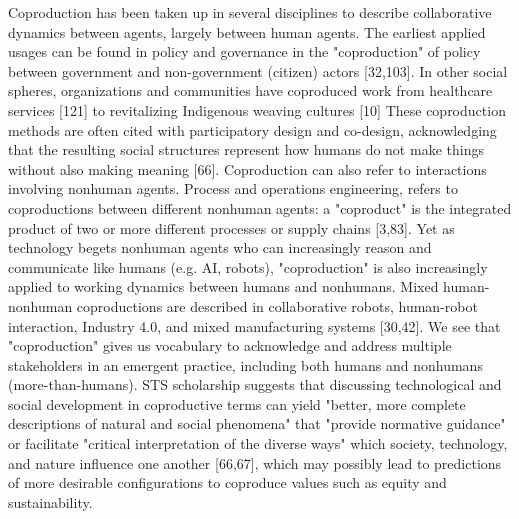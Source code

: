 Coproduction has been taken up in several disciplines to describe collaborative dynamics between agents, largely between human agents. The earliest applied usages can be found in policy and governance in the "coproduction" of policy between government and non-government (citizen) actors [32,103]. In other social spheres, organizations and communities have coproduced work from healthcare services [121] to revitalizing Indigenous weaving cultures [10] These coproduction methods are often cited with participatory design and co-design, acknowledging that the resulting social structures represent how humans do not make things without also making meaning [66]. Coproduction can also refer to interactions involving nonhuman agents. Process and operations engineering, refers to coproductions between different nonhuman agents: a "coproduct" is the integrated product of two or more different processes or supply chains [3,83]. Yet as technology begets nonhuman agents who can increasingly reason and communicate like humans (e.g. AI, robots), "coproduction" is also increasingly applied to working dynamics between humans and nonhumans. Mixed human-nonhuman coproductions are described in collaborative robots, human-robot interaction, Industry 4.0, and mixed manufacturing systems [30,42]. We see that "coproduction" gives us vocabulary to acknowledge and address multiple stakeholders in an emergent practice, including both humans and nonhumans (more-than-humans). STS scholarship suggests that discussing technological and social development in coproductive terms can yield "better, more complete descriptions of natural and social phenomena" that "provide normative guidance" or facilitate "critical interpretation of the diverse ways" which society, technology, and nature influence one another [66,67], which may possibly lead to predictions of more desirable configurations to coproduce values such as equity and sustainability.


